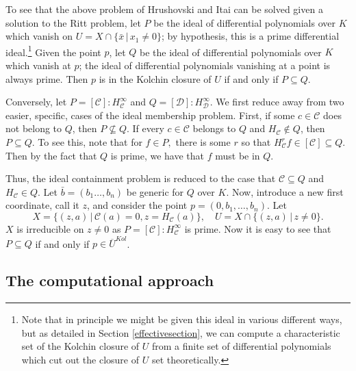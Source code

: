 \documentclass[12pt]{amsart}
\theoremstyle{definition}
\newcounter{cases}[theorem]
\numberwithin{subcase}{cases}
\theoremstyle{remark}
\newcommand{\mc}[1]{\mathcal{#1}}
\begin{document}
To see that the above problem of Hrushovski and Itai can be solved given a solution to the Ritt problem, let $P$ be the ideal of differential polynomials over $K$ which vanish on $U = X \cap \{\bar x \, | \, x_1 \neq 0\}$; by hypothesis, this is a prime differential ideal.\footnote{Note that in principle we might be given this ideal in various different ways, but as detailed in Section \ref{effectivesection}, we can compute a characteristic set of the Kolchin closure of $U$ from a finite set of differential polynomials which cut out the closure of $U$ set theoretically.} Given the point $p$, let $Q$ be the ideal of differential polynomials over $K$ which vanish at $p$; the ideal of differential polynomials vanishing at a point is always prime. Then $p$ is in the Kolchin closure of $U$ if and only if $P \subseteq Q$. 

Conversely, let $P = [\mc C] : H_{\mc C} ^ \infty$ and $Q = [\mc D] : H_{\mc D} ^ \infty$. We first reduce away from two easier, specific, cases of the ideal membership problem. First, if some $c \in \mc C$ does not belong to $Q$, then $P \not \subseteq Q$. If every $c \in \mc C$ belongs to $Q$ and $H_{\mc{C}} \notin Q$, then $P \subseteq Q.$ To see this, note that for $f \in P,$ there is some $r$ so that $H_{\mc{C}}^r f \in [\mc C] \subseteq Q$. Then by the fact that $Q$ is prime, we have that $f $ must be in $Q$. 

Thus, the ideal containment problem is reduced to the case that $\mc C \subseteq Q$ and $H_{\mc{C}} \in Q$. Let $\bar b = (b_1 \ldots , b_n)$ be generic for $Q$ over $K$. Now, introduce a new first coordinate, call it $z$, and consider the point $p = (0, b_1, \ldots , b_n)$. Let \[X = \{(z,a) \, | \, \mc C(a) = 0, z = H_{\mc{C}}(a) \}, \quad U = X \cap \{(z,a) \, | \, z \neq 0\}.\]
$X$ is irreducible on $z \neq 0$ as $P = [\mc{C}] : H_{\mc{C}}^\infty$ is prime. Now it is easy to see that $P \subseteq Q$ if and only if $p \in \overline{U}^{Kol}$. 

\subsection{The computational approach}
\end{document}
